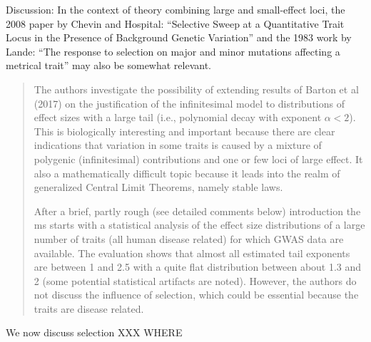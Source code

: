 \begin{point}{}
    Discussion: In the context of theory combining large and small-effect loci, the 2008 paper by Chevin and Hospital: ``Selective Sweep at a Quantitative Trait Locus in the Presence of Background Genetic Variation'' and the 1983 work by Lande: ``The response to selection on major and minor mutations affecting a metrical trait'' may also be somewhat relevant.
\end{point}

\reply{
}


\begin{quote}
The authors investigate the possibility of extending results of Barton et al (2017) on the
justification of the infinitesimal model to distributions of effect sizes with a large tail (i.e.,
polynomial decay with exponent $\alpha < 2$). This is biologically interesting and important
because there are clear indications that variation in some traits is caused by a mixture
of polygenic (infinitesimal) contributions and one or few loci of large effect. It also a
mathematically difficult topic because it leads into the realm of generalized Central Limit
Theorems, namely stable laws.

After a brief, partly rough (see detailed comments below) introduction the ms starts with
a statistical analysis of the effect size distributions of a large number of traits (all human
disease related) for which GWAS data are available. The evaluation shows that almost
all estimated tail exponents are between 1 and 2.5 with a quite flat distribution between
about 1.3 and 2 (some potential statistical artifacts are noted). However, the authors do
not discuss the influence of selection, which could be essential because the traits are disease
related.
\end{quote}

We now discuss selection XXX WHERE

